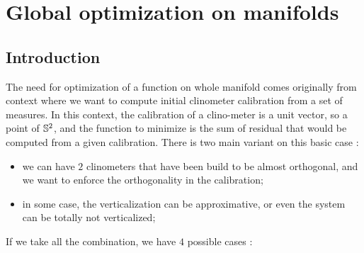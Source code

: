 
\section{Global optimization on manifolds}


\subsection{Introduction}

\label{HeurOpt:Man:Intro}

The need for optimization of a function on whole manifold comes originally from context where
we want to compute initial clinometer calibration from a set of measures.
In this context,  the calibration of a clino-meter is a unit vector, so a point of $\mathbb{S}^2$, and the function to minimize
is the sum of residual that would be computed from a given calibration.  There is two main variant on
this basic case :

\begin{itemize}
   \item we can have $2$ clinometers that have been build to be almost orthogonal, and we want to enforce
         the orthogonality in the calibration;

   \item in some case, the verticalization can be approximative, or even the system can be totally not
         verticalized; 
\end{itemize}

If we take all the combination, we have $4$ possible cases :

